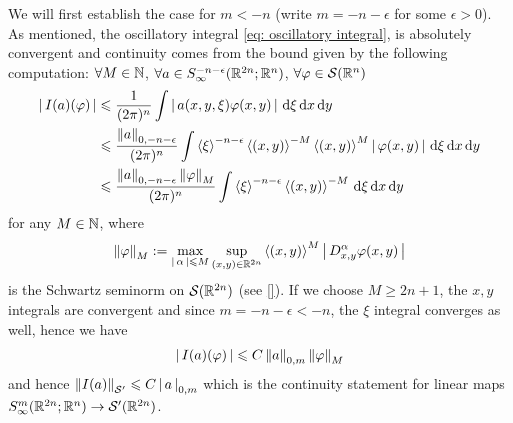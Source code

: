 \documentclass[12pt]{article}
\begin{document}
We will first establish the case for $m < -n$ (write $m = -n - \epsilon$ for some $\epsilon > 0$). As mentioned, the oscillatory integral \ref{eq: oscillatory integral}, is absolutely convergent and continuity comes from the bound given by the following computation: $\forall M \in \N$, $\forall a \in S^{-n -\epsilon}_\infty(\R^{2n}; \R^n)$, $\forall \varphi \in \sch(\R^n)$ 
\begin{align*}
    \abs{I(a)(\varphi)}
    & \leq \frac{1}{(2\pi)^n} \int \abs{a(x, y, \xi) \varphi(x, y)} \d[\xi] \d[x] \d[y]\\
    & \leq \frac{\norm[a]_{0, -n -\epsilon}}{(2\pi)^n} \int \sym[\xi]^{-n -\epsilon} \sym[(x, y)]^{-M} \sym[(x, y)]^{M} \abs{\varphi(x, y)} \d[\xi] \d[x] \d[y]\\
    & \leq \frac{\norm[a]_{0, -n -\epsilon} \norm[\varphi]_M}{(2\pi)^n} \int \sym[\xi]^{-n -\epsilon} \sym[(x, y)]^{-M}  \d[\xi] \d[x] \d[y]\\
\end{align*}
for any $M \in \N$, where 
\begin{align} \label{eq: Schwartz seminorm} 
    \norm[\varphi]_M :=  \max_{\abs{\alpha} \leq M}  \sup_{(x, y) \in \R^{2n}} \sym[(x, y)]^M \abs{D^{\alpha}_{x, y} \varphi(x, y)}
\end{align}
is the Schwartz  seminorm on $\sch(\R^{2n})$ (see \ref{}). If we choose $M \geq 2n +1$, the $x, y$ integrals are convergent and since $m = -n -\epsilon < -n$, the $\xi$ integral converges as well, hence we have 
\begin{align*}
    \abs{I(a)(\varphi)} \leq C \norm[a]_{0, m} \norm[\varphi]_M
\end{align*}
and hence $\norm[I(a)]_{\sch'} \leq C \abs{a}_{0, m}$ which is the continuity statement for linear maps $S^{m}_{\infty}(\R^{2n}; \R^{n}) \to \sch'(\R^{2n})$. \\
\end{document}
